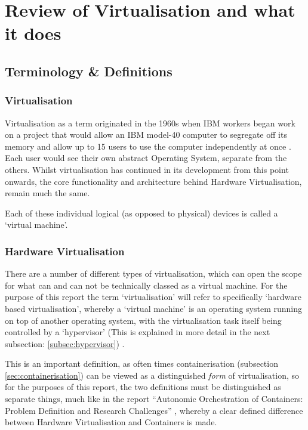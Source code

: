 
\chapter{Review of Virtualisation and what it does}

\section{Terminology \& Definitions}

\subsection{Virtualisation}
Virtualisation as a term originated in the 1960s when IBM workers began work on a project that would allow an IBM model-40 computer to segregate off its memory and allow up to 15 users to use the computer independently at once \citep{Lindquist1966}. Each user would see their own abstract Operating System, separate from the others. Whilst virtualisation has continued in its development from this point onwards, the core functionality and architecture behind Hardware Virtualisation, remain much the same.

Each of these individual logical (as opposed to physical) devices is called a `virtual machine'.

\subsection{Hardware Virtualisation}
\label{subsec:HardwareVirtualisation}
There are a number of different types of virtualisation, which can open the scope for what can and can not be technically classed as a virtual machine. For the purpose of this report the term `virtualisation' will refer to specifically `hardware based virtualisation', whereby a `virtual machine' is an operating system running on top of another operating system, with the virtualisation task itself being controlled by a `hypervisor' (This is explained in more detail in the next subsection: \ref{subsec:hypervisor}) .

This is an important definition, as often times containerisation (subsection \ref{sec:containerisation}) can be viewed as a distinguished \emph{form} of virtualisation, so for the purposes of this report, the two definitions must be distinguished as separate things, much like in the report ``Autonomic Orchestration of Containers: Problem Definition and Research Challenges'' \citep{casalicchio2016}, whereby a clear defined difference between Hardware Virtualisation and Containers is made.

